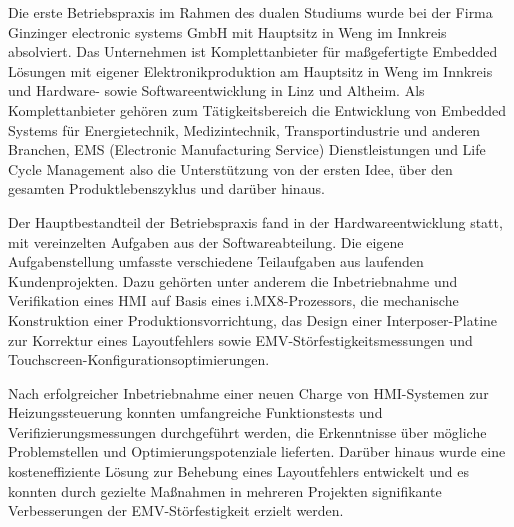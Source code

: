 \documentclass[praktikum,german]{hgbthesis}
\begin{document}




Die erste Betriebspraxis im Rahmen des dualen Studiums wurde bei der Firma Ginzinger electronic systems GmbH mit Hauptsitz in Weng im Innkreis absolviert.
Das Unternehmen ist Komplettanbieter für maßgefertigte Embedded Lösungen mit eigener Elektronikproduktion am Hauptsitz in Weng im Innkreis und Hardware- sowie Softwareentwicklung in Linz und Altheim. Als Komplettanbieter gehören zum Tätigkeitsbereich die Entwicklung von Embedded Systems für Energietechnik, Medizintechnik, Transportindustrie und anderen Branchen, EMS (Electronic Manufacturing Service) Dienstleistungen und Life Cycle Management also die Unterstützung von der ersten Idee, über den gesamten Produktlebenszyklus und darüber hinaus.\cite{Ginzinger}

Der Hauptbestandteil der Betriebspraxis fand in der Hardwareentwicklung statt, mit vereinzelten Aufgaben aus der Softwareabteilung. Die eigene Aufgabenstellung umfasste verschiedene Teilaufgaben aus laufenden Kundenprojekten. Dazu gehörten unter anderem die Inbetriebnahme und Verifikation eines HMI auf Basis eines i.MX8-Prozessors, die mechanische Konstruktion einer Produktionsvorrichtung, das Design einer Interposer-Platine zur Korrektur eines Layoutfehlers sowie EMV-Störfestigkeitsmessungen und Touchscreen-Konfigurationsoptimierungen.

Nach erfolgreicher Inbetriebnahme einer neuen Charge von HMI-Systemen zur Heizungssteuerung konnten umfangreiche Funktionstests und Verifizierungsmessungen durchgeführt werden, die Erkenntnisse über mögliche Problemstellen und Optimierungspotenziale lieferten. Darüber hinaus wurde eine kosteneffiziente Lösung zur Behebung eines Layoutfehlers entwickelt und es konnten durch gezielte Maßnahmen in mehreren Projekten signifikante Verbesserungen der EMV-Störfestigkeit erzielt werden.
\end{document}
